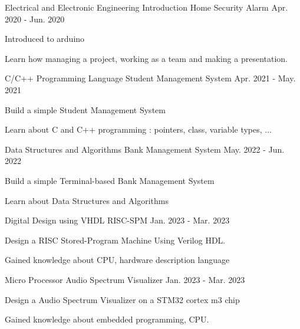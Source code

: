 \begin{cventries}
  \cventry
  {Electrical and Electronic Engineering Introduction}
  {Home Security Alarm}
  {}
  {Apr. 2020 - Jun. 2020}
  {
    \begin{cvitems}
      \item {Introduced to arduino}
      \item {Learn how managing a project, working as a team and making a presentation.}
    \end{cvitems}
  }
\end{cventries}

\begin{cventries}
  \cventry
  {C/C++ Programming Language}
  {Student Management System}
  {}
  {Apr. 2021 - May. 2021}
  {
    \begin{cvitems}
      \item {Build a simple Student Management System}
      \item {Learn about C and C++ programming : pointers, class, variable types, ...}
    \end{cvitems}
  }
\end{cventries}

\begin{cventries}
  \cventry
  {Data Structures and Algorithms}
  {Bank Management System}
  {}
  {May. 2022 - Jun. 2022}
  {
    \begin{cvitems}
      \item {Build a simple Terminal-based Bank Management System}
      \item {Learn about Data Structures and Algorithms}
    \end{cvitems}
  }
\end{cventries}

\begin{cventries}
  \cventry
  {Digital Design using VHDL}
  {RISC-SPM}
  {}
  {Jan. 2023 - Mar. 2023}
  {
    \begin{cvitems}
      \item {Design a RISC Stored-Program Machine Using Verilog HDL.}
      \item {Gained knowledge about CPU, hardware description language}
    \end{cvitems}
  }
\end{cventries}

\begin{cventries}
  \cventry
  {Micro Processor}
  {Audio Spectrum Visualizer}
  {}
  {Jan. 2023 - Mar. 2023}
  {
    \begin{cvitems}
      \item {Design a Audio Spectrum Visualizer on a STM32 cortex m3 chip}
      \item {Gained knowledge about embedded programming, CPU.}
    \end{cvitems}
  }
\end{cventries}

